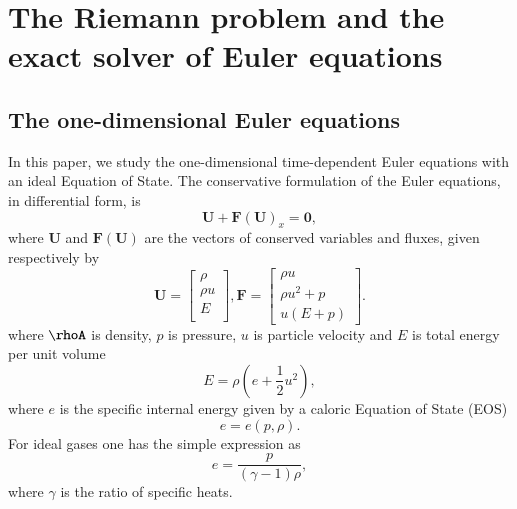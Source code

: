 \documentclass[review]{elsarticle}
\begin{document}
%
%
%
\section{The Riemann problem and the exact solver of Euler equations}

\subsection{The one-dimensional Euler equations \cite{toro2013riemann}}
In this paper, we study the one-dimensional time-dependent Euler equations with an ideal Equation of State. The conservative formulation of the Euler equations, in differential form, is
\begin{equation}\label{eq:euler1}
  \mathbf{U}+\mathbf{F}(\mathbf{U})_x = \mathbf{0},
\end{equation}
where $\mathbf{U}$ and $\mathbf{F}(\mathbf{U})$ are the vectors of conserved variables and fluxes, given respectively by
\begin{equation}\label{eq:euler2}
  \mathbf{U} = \left[ \begin{array}{l}
	  \rho\\
	  \rho u \\
	  E \\
  \end{array} \right],
  \mathbf{F} = \left[ \begin{array}{l}
	  \rho u \\
	  \rho u^2+p \\
	  u(E+p)
  \end{array}\right].
\end{equation}
where $\rhoA$ is density, $p$ is pressure, $u$ is particle velocity and $E$ is total energy per unit volume
\begin{equation}
  E = \rho \left( e+ \frac{1}{2}u^2\right),
\end{equation}
where $e$ is the specific internal energy given by a caloric Equation of State (EOS)
\begin{equation}
  e = e(p,\rho).
\end{equation}
For ideal gases one has the simple expression as
\begin{equation}
  e = \frac{p}{(\gamma -1)\rho},
\end{equation}
where $\gamma $ is the ratio of specific heats. 
\end{document}
